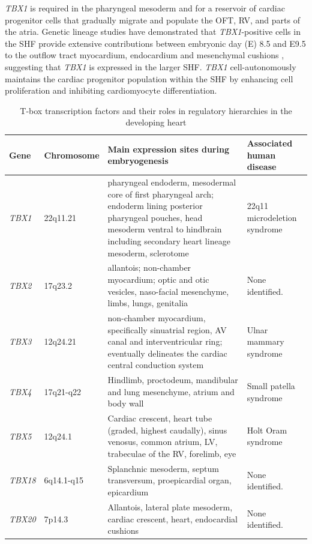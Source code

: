 \begin{refsection}
\textit{TBX1} is required in the pharyngeal mesoderm \cite{naiche2005t} and for a reservoir of cardiac progenitor cells that gradually migrate and populate the OFT, RV, and parts of the atria. Genetic lineage studies have demonstrated that \textit{TBX1}-positive cells in the SHF provide extensive contributions between embryonic day (E) 8.5 and E9.5 to the outflow tract myocardium, endocardium and mesenchymal cushions \cite{naiche2005t,plageman2005t}, suggesting that \textit{TBX1} is expressed in the larger SHF. \textit{TBX1} cell-autonomously maintains the cardiac progenitor population within the SHF by enhancing cell proliferation and inhibiting cardiomyocyte differentiation. 

\begin{landscape}
\begin{table}[!tbp]
\centering
\caption{T-box transcription factors and their roles in regulatory hierarchies in the developing heart \cite{stennard2005t}}
\label{tab:1_2}
\begin{tabular}{  P{1.5in} P{1.5in} p{3in}  P{2in}  }
\hline
	Gene & Chromosome & Main expression sites during embryogenesis & Associated human disease \\ \hline
	\textit{TBX1} & 22q11.21 & pharyngeal endoderm, mesodermal core of first pharyngeal arch;  endoderm lining posterior pharyngeal pouches, head mesoderm ventral to hindbrain including secondary heart lineage mesoderm, sclerotome & 22q11 microdeletion syndrome \\ \hline
	\textit{TBX2} & 17q23.2 & allantois; non-chamber myocardium; optic and otic vesicles, naso-facial mesenchyme, limbs, lungs, genitalia & None identified. \\ \hline
	\textit{TBX3} & 12q24.21 & non-chamber myocardium, specifically sinuatrial region, AV canal and interventricular ring; eventually delineates the cardiac central conduction system & Ulnar mammary syndrome \\ \hline
	\textit{TBX4} & 17q21-q22 & Hindlimb, proctodeum, mandibular and lung mesenchyme, atrium and body wall & Small patella syndrome \\ \hline
	\textit{TBX5} & 12q24.1 & Cardiac crescent, heart tube (graded, highest caudally), sinus venosus, common atrium, LV, trabeculae of the RV, forelimb, eye & Holt Oram syndrome \\ \hline
	\textit{TBX18} & 6q14.1-q15 & Splanchnic mesoderm, septum transversum, proepicardial organ, epicardium & None identified. \\ \hline
	\textit{TBX20} & 7p14.3 & Allantois, lateral plate mesoderm, cardiac crescent, heart, endocardial cushions & None identified. \\ \hline
\end{tabular}
\end{table}
\end{landscape}


\end{refsection}

